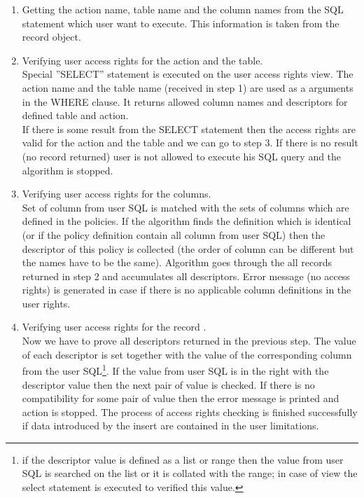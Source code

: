 \begin{enumerate}
\item Getting the action name, table name and the column names from the SQL statement which user want to execute.
This information is taken from the record object.

\item Verifying user access rights for the action and the table.\\
Special ''SELECT'' statement is executed on the user access rights view. The action name and the table name (received in step 1) are used
as a arguments in the WHERE clause. It returns allowed column names and descriptors for defined table and action.\\
If there is some result from the SELECT statement then the access rights are valid for the action and the table and we can go to step 3. If there is no result (no record returned) user is not allowed to execute his SQL query and the algorithm is stopped.

\item Verifying user access rights for the columns.\\ 
Set of column from user SQL is matched with the sets of columns which are defined in the policies. If the algorithm finds the definition  which is identical (or if the policy definition contain all column from user SQL) then the descriptor of this policy is collected (the order of column can be different but the names have to be the same). Algorithm goes through the all records returned in step 2 and accumulates all descriptors. Error message (no access rights) is generated in case if there is no applicable column definitions in the user rights.

\item Verifying user access rights for the record .\\
Now we have to prove all descriptors returned in the previous step. The value of each descriptor is set together with the value of the corresponding column from the user SQL\footnote{if the descriptor value is defined as a list or range then the value from user SQL is searched on the list or it is collated with the range; in case of view the select statement is executed to verified this value.}. If the value from user SQL is in the right with the descriptor value then the next pair of value is checked. If there is no compatibility for some pair of value then the error message is printed and action is stopped. The process of access rights checking is finished successfully if data introduced by the insert are contained in the user limitations. 
\end{enumerate}
